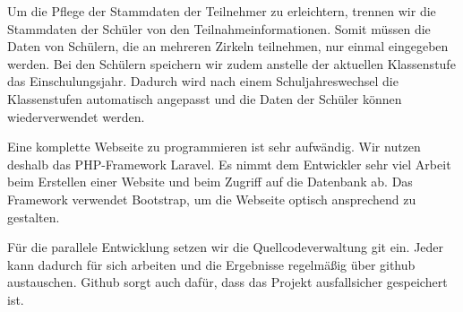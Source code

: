 Um die Pflege der Stammdaten der Teilnehmer zu erleichtern, trennen wir die Stammdaten der Schüler von den Teilnahmeinformationen. Somit müssen die Daten von Schülern, die an mehreren Zirkeln teilnehmen, nur einmal eingegeben werden. Bei den Schülern speichern wir zudem anstelle der aktuellen Klassenstufe das Einschulungsjahr. Dadurch wird nach einem Schuljahreswechsel die Klassenstufen automatisch angepasst und die Daten der Schüler können wiederverwendet werden.

Eine komplette Webseite zu programmieren ist sehr aufwändig. Wir nutzen deshalb das PHP-Framework Laravel. Es nimmt dem Entwickler sehr viel Arbeit beim Erstellen einer Website und beim Zugriff auf die Datenbank ab. Das Framework verwendet Bootstrap, um die Webseite optisch ansprechend zu gestalten. \cite{Bootstrap} \cite{laravel}

Für die parallele Entwicklung setzen wir die Quellcodeverwaltung git ein. Jeder kann dadurch für sich arbeiten und die Ergebnisse regelmäßig über github austauschen. Github sorgt auch dafür, dass das Projekt ausfallsicher gespeichert ist.